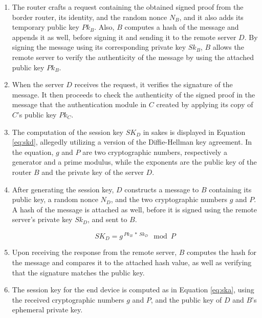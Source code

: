 \begin{enumerate}

\item The router crafts a request containing the obtained signed proof from the border router, its identity, and the random nonce $N_B$, and it also adds its temporary public key $Pk_B$. Also, $B$ computes a hash of the message and appends it as well, before signing it and sending it to the remote server $D$. By signing the message using its corresponding private key $Sk_B$, $B$ allows the remote server to verify the authenticity of the message by using the attached public key $Pk_B$.

\item When the server $D$ receives the request, it verifies the signature of the message. It then proceeds to check the authenticity of the signed proof in the message that the authentication module in $C$ created by applying its copy of $C$'s public key $Pk_C$.

\item The computation of the session key $SK_D$ in \gls{sakes} is displayed in Equation \ref{eq:skd}, allegedly utilizing a version of the Diffie-Hellman key agreement. In the equation, $g$ and $P$ are two cryptographic numbers, respectively a generator and a prime modulus, while the exponents are the public key of the router $B$ and the private key of the server $D$.

\item After generating the session key, $D$ constructs a message to $B$ containing its public key, a random nonce $N_D$, and the two cryptographic numbers $g$ and $P$. A hash of the message is attached as well, before it is signed using the remote server's private key $Sk_D$, and sent to $B$.

\begin{equation}
\label{eq:skd}
SK_D = g^{\ Pk_{B}\ *\ Sk_D} \mod P
\end{equation}

\item Upon receiving the response from the remote server, $B$ computes the hash for the message and compares it to the attached hash value, as well as verifying that the signature matches the public key.

\item  The session key for the end device is computed as in Equation \ref{eq:ska}, using the received cryptographic numbers $g$ and $P$, and the public key of $D$ and $B$'s ephemeral private key.


\end{enumerate}
